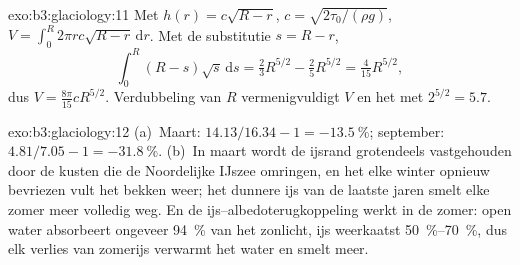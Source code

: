\begin{solution}{exo:b3:glaciology:11}
Met $h(r) = c\sqrt{R - r}$, $c = \sqrt{2\tau_0/(\rho g)}$, $V =
\int_0^R2\pi rc\sqrt{R - r}\,\mathrm dr$. Met de substitutie $s = R - r$,
\[
\int_0^R(R - s)\sqrt s\,\mathrm ds = \tfrac23R^{5/2} - \tfrac25R^{5/2} =
\tfrac4{15}R^{5/2},
\]
dus $V = \frac{8\pi}{15}cR^{5/2}$. Verdubbeling van $R$
vermenigvuldigt $V$ en het  met $2^{5/2} = 5.7$.
\end{solution}

\begin{solution}{exo:b3:glaciology:12}
(a)~Maart: $14.13/16.34 - 1 = \qty{-13.5}{\percent}$; september: $4.81/7.05
- 1 = \qty{-31.8}{\percent}$. (b)~In maart wordt de ijsrand grotendeels vastgehouden door
de kusten die de Noordelijke IJszee omringen, en het elke winter opnieuw
bevriezen vult het bekken weer; het dunnere ijs van de laatste jaren smelt elke zomer meer
volledig weg. En de ijs--albedoterugkoppeling werkt in de zomer: open
water absorbeert ongeveer \qty{94}{\percent} van het zonlicht, ijs weerkaatst
\qtyrange{50}{70}{\percent}, dus elk verlies van zomerijs verwarmt het water en
smelt meer.
\end{solution}


